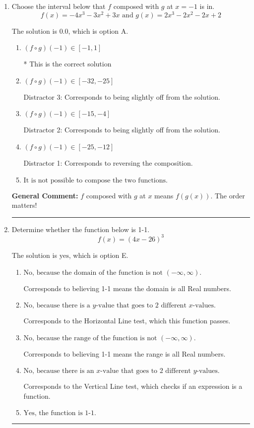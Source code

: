 \documentclass{extbook}[14pt]
\newcommand{\litem}[1]{\item #1

\rule{\textwidth}{0.4pt}}
\begin{document}
\begin{enumerate}\litem{
Choose the interval below that $f$ composed with $g$ at $x=-1$ is in.
\[ f(x) = -4x^{3} -3 x^{2} +3 x \text{ and } g(x) = 2x^{3} -2 x^{2} -2 x + 2 \]

The solution is \( 0.0 \), which is option A.\begin{enumerate}[label=\Alph*.]
\item \( (f \circ g)(-1) \in [-1, 1] \)

* This is the correct solution
\item \( (f \circ g)(-1) \in [-32, -25] \)

 Distractor 3: Corresponds to being slightly off from the solution.
\item \( (f \circ g)(-1) \in [-15, -4] \)

 Distractor 2: Corresponds to being slightly off from the solution.
\item \( (f \circ g)(-1) \in [-25, -12] \)

 Distractor 1: Corresponds to reversing the composition.
\item \( \text{It is not possible to compose the two functions.} \)


\end{enumerate}

\textbf{General Comment:} $f$ composed with $g$ at $x$ means $f(g(x))$. The order matters!
}
\litem{
Determine whether the function below is 1-1.
\[ f(x) = (4 x - 26)^3 \]

The solution is \( \text{yes} \), which is option E.\begin{enumerate}[label=\Alph*.]
\item \( \text{No, because the domain of the function is not $(-\infty, \infty)$.} \)

Corresponds to believing 1-1 means the domain is all Real numbers.
\item \( \text{No, because there is a $y$-value that goes to 2 different $x$-values.} \)

Corresponds to the Horizontal Line test, which this function passes.
\item \( \text{No, because the range of the function is not $(-\infty, \infty)$.} \)

Corresponds to believing 1-1 means the range is all Real numbers.
\item \( \text{No, because there is an $x$-value that goes to 2 different $y$-values.} \)

Corresponds to the Vertical Line test, which checks if an expression is a function.
\item \( \text{Yes, the function is 1-1.} \)


\end{enumerate}}
\end{enumerate}
\end{document}

